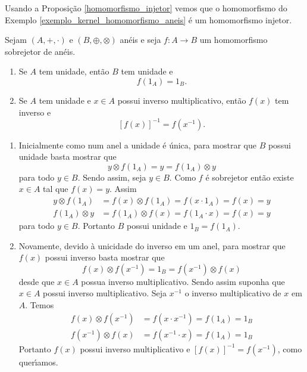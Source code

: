 Usando a Proposição \ref{homomorfismo_injetor} vemos que o homomorfismo do Exemplo \ref{exemplo_kernel_homomorfismo_aneis} é um homomorfismo injetor.
\begin{proposicao}
	Sejam $(A, +, \cdot)$ e $(B, \oplus, \otimes)$ an\'eis e seja $f : A \to B$ um homomorfismo sobrejetor de an\'eis.
	\begin{enumerate}[label={\roman*})]
		\item Se $A$ tem unidade, ent\~ao $B$ tem unidade e
		\[
			f(1_A) = 1_B.
		\]
		\item Se $A$ tem unidade e $x \in A$ possui inverso multiplicativo, ent\~ao $f(x)$ tem inverso e
		\[
			[f(x)]^{-1} = f(x^{-1}).
		\]
	\end{enumerate}
\end{proposicao}
\begin{prova}
	\begin{enumerate}[label={\roman*})]
		\item Inicialmente como num anel a unidade \'e \'unica, para mostrar que $B$ possui unidade basta mostrar que
		\[
			y\otimes f(1_A) = y = f(1_A)\otimes y
		\]
		para todo $y \in B$. Sendo assim, seja $y \in B$. Como $f$ \'e sobrejetor ent\~ao existe $x \in A$ tal que $f(x) = y$. Assim
		\begin{align*}
			y\otimes f(1_A) &= f(x) \otimes f(1_A) = f(x\cdot 1_A) = f(x) = y\\
			f(1_A)\otimes y &= f(1_A) \otimes f(x) = f(1_A\cdot x) = f(x) = y
		\end{align*}
		para todo $y \in B$. Portanto $B$ possui unidade e $1_B = f(1_A)$.

		\item Novamente, devido \`a unicidade do inverso em um anel, para mostrar que $f(x)$ possui inverso basta mostrar que
		\[
			f(x)\otimes f(x^{-1}) = 1_B = f(x^{-1})\otimes f(x)
		\]
		desde que $x \in A$ possua inverso multiplicativo. Sendo assim suponha que $x \in A$ possui inverso multiplicativo. Seja $x^{-1}$ o inverso multiplicativo de $x$ em $A$. Temos
		\begin{align*}
			f(x)\otimes f(x^{-1}) &= f(x\cdot x^{-1}) = f(1_A) = 1_B\\
			f(x^{-1})\otimes f(x) &= f(x^{-1}\cdot x) = f(1_A) = 1_B
		\end{align*}
		Portanto $f(x)$ possui inverso multiplicativo e $[f(x)]^{-1} = f(x^{-1})$, como quer{\'\i}amos.
	\end{enumerate}
\end{prova}

